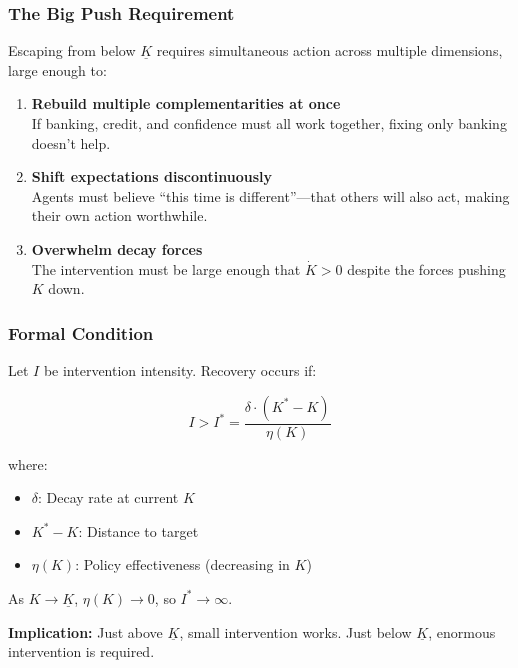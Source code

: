 \subsubsection{The Big Push Requirement}

Escaping from below $\underline{K}$ requires simultaneous action across 
multiple dimensions, large enough to:

\begin{enumerate}
    \item \textbf{Rebuild multiple complementarities at once} \\
    If banking, credit, and confidence must all work together, 
    fixing only banking doesn't help.
    
    \item \textbf{Shift expectations discontinuously} \\
    Agents must believe ``this time is different''---that others 
    will also act, making their own action worthwhile.
    
    \item \textbf{Overwhelm decay forces} \\
    The intervention must be large enough that $\dot{K} > 0$ 
    despite the forces pushing $K$ down.
\end{enumerate}

\subsubsection{Formal Condition}

Let $I$ be intervention intensity. Recovery occurs if:

\begin{equation}
I > I^* = \frac{\delta \cdot (K^* - K)}{\eta(K)}
\label{eq:big-push}
\end{equation}

where:
\begin{itemize}
    \item $\delta$: Decay rate at current $K$
    \item $K^* - K$: Distance to target
    \item $\eta(K)$: Policy effectiveness (decreasing in $K$)
\end{itemize}

As $K \to \underline{K}$, $\eta(K) \to 0$, so $I^* \to \infty$.

\textbf{Implication:} Just above $\underline{K}$, small intervention works. 
Just below $\underline{K}$, enormous intervention is required.

